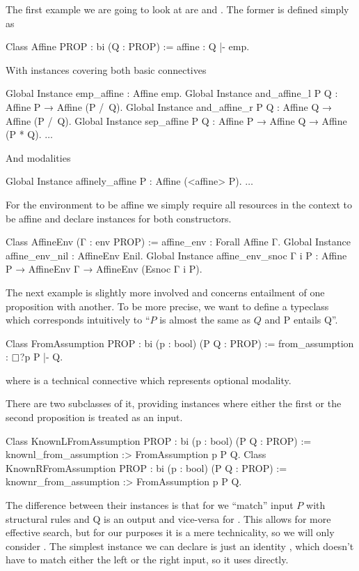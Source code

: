 The first example we are going to look at are  and .
The former is defined simply as
\begin{coq}
Class Affine {PROP : bi} (Q : PROP) := affine : Q |- emp.
\end{coq}

With instances covering both basic connectives
\begin{coq}
Global Instance emp_affine : Affine emp.
Global Instance and_affine_l P Q : Affine P → Affine (P /\ Q).
Global Instance and_affine_r P Q : Affine Q → Affine (P /\ Q).
Global Instance sep_affine P Q : Affine P → Affine Q → Affine (P * Q).
$\ldots$
\end{coq}

And modalities
\begin{coq}
Global Instance affinely_affine P : Affine (<affine> P).
$\ldots$
\end{coq}

For the environment to be affine we simply require all resources in the context to be affine and declare instances for both constructors.
\begin{coq}
Class AffineEnv (Γ : env PROP) := affine_env : Forall Affine Γ.
Global Instance affine_env_nil : AffineEnv Enil.
Global Instance affine_env_snoc Γ i P :
  Affine P → AffineEnv Γ → AffineEnv (Esnoc Γ i P).
\end{coq}

The next example is slightly more involved and concerns entailment of one proposition with another.
To be more precise, we want to define a typeclass which corresponds intuitively to ``\(P\) is almost the same as \(Q\) and P entails Q''.
\begin{coq}
Class FromAssumption {PROP : bi} (p : bool) (P Q : PROP) :=
  from_assumption : $\mathop{\Box}$?p P |- Q.
\end{coq}
where  is a technical connective which represents optional modality.

There are two subclasses of it, providing instances where either the first or the second proposition is treated as an input.
\begin{coq}
Class KnownLFromAssumption {PROP : bi} (p : bool) (P Q : PROP) :=
  knownl_from_assumption :> FromAssumption p P Q.
Class KnownRFromAssumption {PROP : bi} (p : bool) (P Q : PROP) :=
  knownr_from_assumption :> FromAssumption p P Q.
\end{coq}

The difference between their instances is that for  we ``match'' input \(P\) with structural rules and Q is an output and vice-versa for .
This allows for more effective search, but for our purposes it is a mere technicality, so we will only consider .
The simplest instance we can declare is just an identity , which doesn't have to match either the left or the right input, so it uses  directly.

